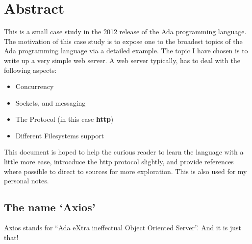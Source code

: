 \section{Abstract} 
This is a small case study in the 2012 release of the Ada programming language. The motivation of this case study is to expose one to the broadest topics of the Ada programming language via a detailed example. The topic I have chosen is to write up a very simple web server. A web server typically, has to deal with the following aspects:
\begin{itemize}
\item Concurrency
\item Sockets, and messaging
\item The Protocol (in this case \textbf{http})
\item Different Filesystems support
\end{itemize} 
This document is hoped to help the curious reader to learn the language with a little more ease, introcduce the http protocol slightly, and provide references where possible to direct to sources for more exploration. This is also used for my personal notes. 

\subsection{The name `Axios'}
Axios stands for ``Ada eXtra ineffectual Object Oriented Server''. And it is just that!

